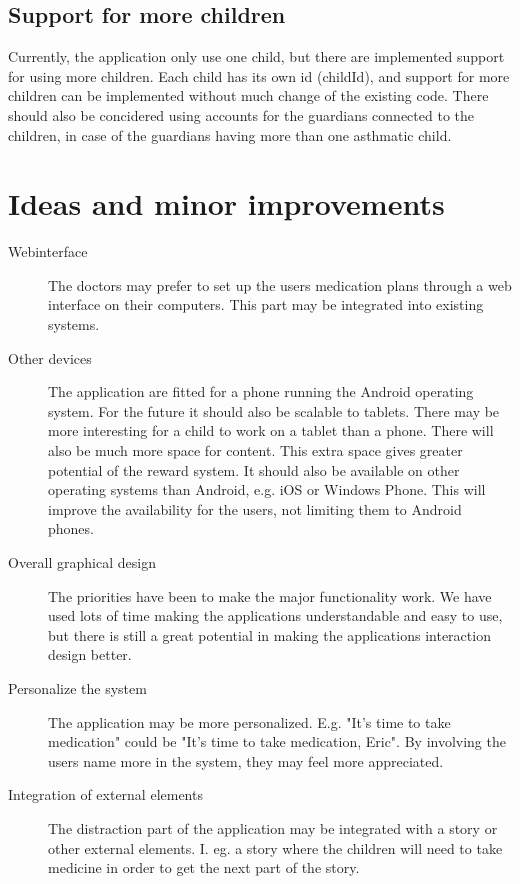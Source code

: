  
\subsection{Support for more children}
Currently, the application only use one child, but there are implemented support for using more children. Each child has its own id (childId), and support for more children can be implemented without much change of the existing code. There should also be concidered using accounts for the guardians connected to the children, in case of the guardians having more than one asthmatic child. 
  

\section{Ideas and minor improvements}


\begin{description}

\item[Webinterface] The doctors may prefer to set up the users medication plans through a web interface on their computers. This part may be integrated into existing systems. 

\item[Other devices] The application are fitted for a phone running the Android operating system. For the future it should also be scalable to tablets. There may be more interesting for a child to work on a tablet than a phone. There will also be much more space for content. This extra space gives greater potential of the reward system. It should also be available on other operating systems than Android, e.g. iOS or Windows Phone. This will improve the availability for the users, not limiting them to Android phones. 

\item[Overall graphical design] The priorities have been to make the major functionality work. We have used lots of time making the applications understandable and easy to use, but there is still a great potential in making the applications interaction design better. 

\item[Personalize the system] The application may be more personalized. E.g. "It's time to take medication" could be "It's time to take medication, Eric". By involving the users name more in the system, they may feel more appreciated. 

\item[Integration of external elements] The distraction part of the application may be integrated with a story or other external elements. I. eg. a story where the children will need to take medicine in order to get the next part of the story.

\end{description}


